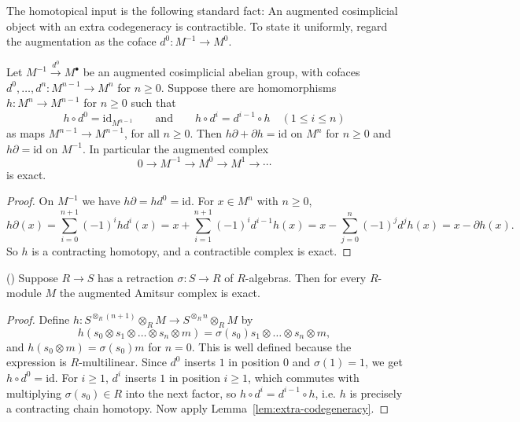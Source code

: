 The homotopical input is the following standard fact: An augmented cosimplicial object with an extra codegeneracy is contractible. To state it uniformly, regard the augmentation as the coface $d^0:M^{-1}\to M^0$.

\begin{lemma}\label{lem:extra-codegeneracy}
	Let $M^{-1}\xrightarrow{d^0}M^\bullet$ be an augmented cosimplicial abelian group, with cofaces $d^0,\dots,d^n:M^{n-1}\to M^n$ for $n\ge0$. Suppose there are homomorphisms $h:M^n\to M^{n-1}$ for $n\ge0$ such that
	\[
	h\circ d^0=\mathrm{id}_{M^{n-1}}\qquad\text{and}\qquad h\circ d^i=d^{i-1}\circ h\quad(1\le i\le n)
	\]
	as maps $M^{n-1}\to M^{n-1}$, for all $n\ge0$. Then $h\partial+\partial h=\mathrm{id}$ on $M^n$ for $n\ge0$ and $h\partial=\mathrm{id}$ on $M^{-1}$. In particular the augmented complex 
	\[
		0\to M^{-1}\to M^0\to M^1\to\cdots
	\] is exact.
\end{lemma}

\begin{proof}
	On $M^{-1}$ we have $h\partial=hd^0=\mathrm{id}$. For $x\in M^n$ with $n\ge0$,
	\[
	h\partial (x) = \sum_{i=0}^{n+1}(-1)^ihd^i(x)=x+\sum_{i=1}^{n+1}(-1)^id^{i-1}h(x)=x-\sum_{j=0}^{n}(-1)^jd^jh(x)=x-\partial h(x) .
	\]
	So $h$ is a contracting homotopy, and a contractible complex is exact.
\end{proof}

\begin{lemma}\label{lem:amitsur-split}
	(\cite[][Lemma~35.3.5, Tag 023F]{stacks-project})
	Suppose $R\to S$ has a retraction $\sigma:S\to R$ of $R$-algebras. Then for every $R$-module $M$ the augmented Amitsur complex is exact.
\end{lemma}

\begin{proof}
	Define $h:S^{\otimes_R(n+1)}\otimes_RM\to S^{\otimes_Rn}\otimes_RM$ by
	\[
	h(s_0\otimes s_1\otimes\dots\otimes s_n\otimes m)=\sigma(s_0)s_1\otimes\dots\otimes s_n\otimes m,
	\]
	and $h(s_0\otimes m)=\sigma(s_0)m$ for $n=0$. This is well defined because the expression is $R$-multilinear.
	Since $d^0$ inserts $1$ in position $0$ and $\sigma(1)=1$, we get $h\circ d^0=\mathrm{id}$. For $i\ge1$, $d^i$ inserts $1$ in position $i\ge1$, which commutes with multiplying $\sigma(s_0)\in R$ into the next factor, so $h\circ d^i=d^{i-1}\circ h$, i.e. $h$ is precisely a contracting chain homotopy. Now apply Lemma~\ref{lem:extra-codegeneracy}.
\end{proof}

